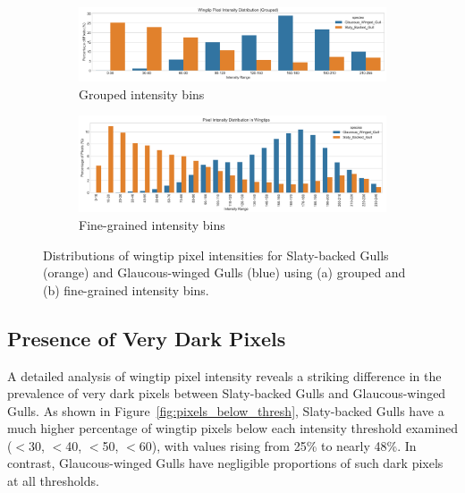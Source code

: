 \documentclass[a4paper,12pt]{report}
\begin{document}
\begin{figure}[h]
    \centering
    \begin{subfigure}[b]{0.47\textwidth}
        \includegraphics[width=\textwidth]{images/REPORT_IMAGES_INTENSITY/I2/intensitydistribution.png}
        \caption{Grouped intensity bins}
        \label{fig:wingtip_intensity_distribution_grouped}
    \end{subfigure}
    \hfill
    \begin{subfigure}[b]{0.47\textwidth}
        \includegraphics[width=\textwidth]{images/REPORT_IMAGES_INTENSITY/I2/TIPdistribution.png}
        \caption{Fine-grained intensity bins}
        \label{fig:wingtip_intensity_distribution_fine}
    \end{subfigure}
    \caption{Distributions of wingtip pixel intensities for Slaty-backed Gulls (orange) and Glaucous-winged Gulls (blue) using (a) grouped and (b) fine-grained intensity bins.}
    \label{fig:wingtip_intensity_distributions}
\end{figure}

\subsection{Presence of Very Dark Pixels}

A detailed analysis of wingtip pixel intensity reveals a striking difference in the prevalence of very dark pixels between Slaty-backed Gulls and Glaucous-winged Gulls. As shown in Figure~\ref{fig:pixels_below_thresh}, Slaty-backed Gulls have a much higher percentage of wingtip pixels below each intensity threshold examined ($<$30, $<$40, $<$50, $<$60), with values rising from 25\% to nearly 48\%. In contrast, Glaucous-winged Gulls have negligible proportions of such dark pixels at all thresholds.
\end{document}
